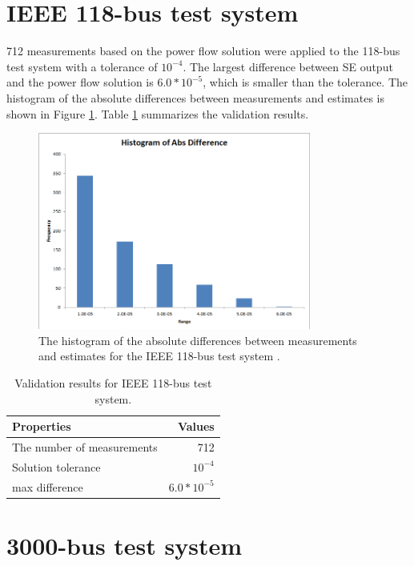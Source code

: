 \documentclass[a4paper]{article}
\begin{document}
\newpage
\section{IEEE 118-bus test system}
\label{sec:118}

712 measurements based on the power flow solution were applied to the 118-bus
test system with a tolerance of $10^{-4}$.  The largest difference between SE
output and the power flow solution is $6.0*10^{-5}$, which is smaller than the
tolerance.  The histogram of the absolute differences between measurements and
estimates is shown in Figure  \ref{fig:118}.  Table \ref{tab:118} summarizes
the validation results.

\begin{figure}[h]
\centering
\includegraphics[width=0.8\textwidth]{118.png}
\caption{\label{fig:hist118}The histogram of the absolute differences between
measurements and estimates for the IEEE 118-bus test system .}
\label{fig:118}
\end{figure}

\begin{table} [h]
\centering
\begin{tabular}{l|r}
Properties & Values \\\hline
The number of measurements & 712 \\
Solution tolerance	& $10^{-4}$ \\
max difference	&  $6.0*10^{-5}$ 
\end{tabular}
\caption{\label{tab:118} Validation results for IEEE 118-bus test system.}
\end{table}


\newpage
\section{3000-bus test system}
\label{sec:3000}
\end{document}
